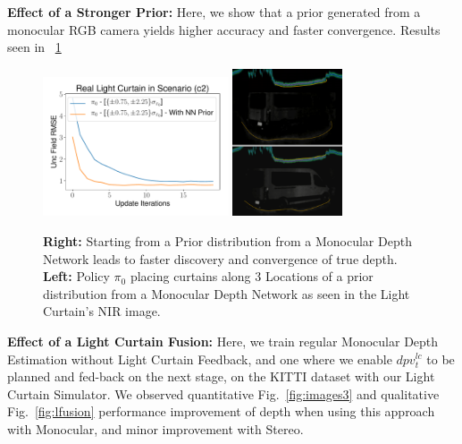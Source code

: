 \textbf{Effect of a Stronger Prior:} Here, we show that a prior generated from a monocular RGB camera yields higher accuracy and faster convergence. Results seen in ~\ref{fig:prior} 

\begin{figure}[h]
   \centering
   \begin{minipage}{0.5\textwidth}
       \centering
       \includegraphics[width=0.49\textwidth]{figures/figure_X.pdf}
       \includegraphics[width=0.29\textwidth]{figures/placement3.png}
   \end{minipage}\hfill
   \centering
   \caption{ \textbf{Right:} Starting from a Prior distribution from a Monocular Depth Network leads to faster discovery and convergence of true depth. \textbf{Left:} Policy $\pi_{0}$ placing curtains along 3 Locations of a prior distribution from a Monocular Depth Network as seen in the Light Curtain's NIR image.}
   \label{fig:prior} 
\end{figure}

\textbf{Effect of a Light Curtain Fusion:} Here, we train regular Monocular Depth Estimation without Light Curtain Feedback, and one where we enable $dpv_{t}^{lc}$ to be planned and fed-back on the next stage, on the KITTI dataset with our Light Curtain Simulator. We observed quantitative Fig.~\ref{fig:images3} and qualitative Fig.~\ref{fig:lfusion} performance improvement of depth when using this approach with Monocular, and minor improvement with Stereo.

